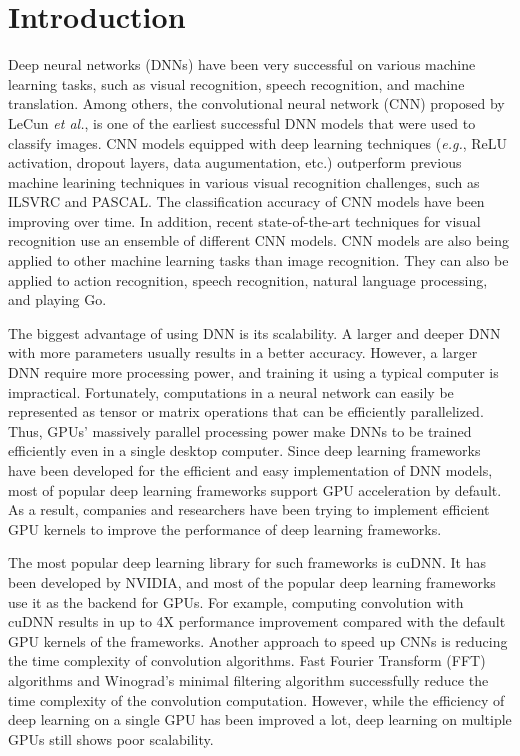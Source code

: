 \section{Introduction}

Deep neural networks (DNNs) have been very successful on various machine learning tasks, such as visual recognition\cite{krizhevsky2012imagenet,vgg,RCNN}, speech recognition\cite{speech}, and machine translation\cite{machinetranslation}.
Among others, the convolutional neural network (CNN) proposed by LeCun \textit{et al.}\cite{726791}, is one of the earliest successful DNN models that were used to classify images.
CNN models equipped with deep learning techniques (\textit{e.g.}, ReLU activation, dropout layers, data augumentation, etc.) outperform previous machine learining techniques in various visual recognition challenges, such as ILSVRC\cite{DBLP:journals/corr/RussakovskyDSKSMHKKBBF14} and PASCAL\cite{pascal}.
The classification accuracy of CNN models have been improving over time.
In addition, recent state-of-the-art techniques for visual recognition use an ensemble of different CNN models\cite{ILSVRC15}.
CNN models are also being applied to other machine learning tasks than image recognition.
They can also be applied to action recognition\cite{actionrecognition}, speech recognition\cite{speech}, natural language processing\cite{DBLP:journals/corr/KalchbrennerGB14}, and playing Go\cite{alphago}.

The biggest advantage of using DNN is its scalability.
A larger and deeper DNN with more parameters usually results in a better accuracy.
However, a larger DNN require more processing power, and training it using a typical computer is impractical.
Fortunately, computations in a neural network can easily be represented as tensor or matrix operations that can be efficiently parallelized.
Thus, GPUs' massively parallel processing power make DNNs to be trained efficiently even in a single desktop computer.
Since deep learning frameworks have been developed for the efficient and easy implementation of DNN models, most of popular deep learning frameworks support GPU acceleration by default\cite{DBLP:journals/corr/Al-RfouAAa16,jia2014caffe,tensorflow2015-whitepaper,torch,cntk}.
As a result, companies and researchers have been trying to implement efficient GPU kernels to improve the performance of deep learning frameworks.

The most popular deep learning library for such frameworks is cuDNN\cite{cudnn}.
It has been developed by NVIDIA, and most of the popular deep learning frameworks use it as the backend for GPUs.
For example, computing convolution with cuDNN results in up to 4X performance improvement compared with the default GPU kernels of the frameworks\cite{convnet-benchmarks}.
Another approach to speed up CNNs is reducing the time complexity of convolution algorithms.
Fast Fourier Transform (FFT) algorithms\cite{fftconv, fbfft} and Winograd's minimal filtering algorithm\cite{winograd} successfully reduce the time complexity of the convolution computation.
However, while the efficiency of deep learning on a single GPU has been improved a lot, deep learning on multiple GPUs still shows poor scalability\cite{DBLP:journals/corr/YadanATR13}.

